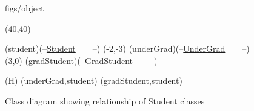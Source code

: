 





\begin {figure}


\Draw

 {figs/object}

\MinNodeSize(40,40)

\RectNode (student)(--\underline {Student}~~~~--)
\MoveToExit(-2,-3)
\RectNode (underGrad)(--\underline {UnderGrad}~~~~--)
\MoveToExit(3,0)
\RectNode (gradStudent)(--\underline {GradStudent}~~~~--)

\ArrowSpec (H)
\Edge(underGrad,student)
\Edge(gradStudent,student)

\EndDraw

\caption {Class diagram showing relationship of Student classes}


\label {fig:studentClasses}

\end {figure}


